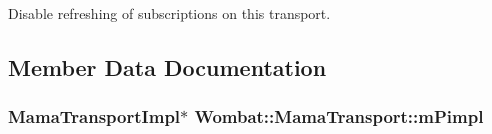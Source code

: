 Disable refreshing of subscriptions on this transport. 

\subsection{Member Data Documentation}
\hypertarget{classWombat_1_1MamaTransport_a19260481cebccd76b8ba3c6bfa86ce88}{
\subsubsection[{mPimpl}]{\setlength{\rightskip}{0pt plus 5cm}MamaTransportImpl$\ast$ {\bf Wombat::MamaTransport::mPimpl}}}
\label{classWombat_1_1MamaTransport_a19260481cebccd76b8ba3c6bfa86ce88}
